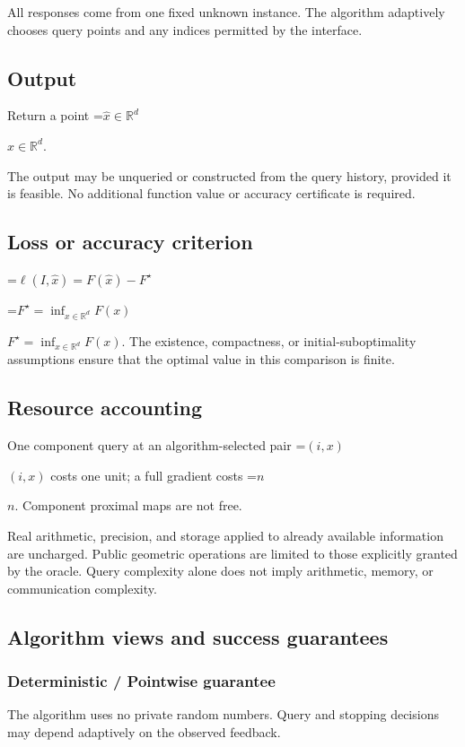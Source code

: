\documentclass[10pt,a4paper]{article}
\newcommand{\AtlasMath}[1]{\par\begingroup\centering\setbox0=\hbox{$\displaystyle #1$}\ifdim\wd0>1.4\linewidth\typeout{ATLAS WIDE FORMULA: \the\wd0}\fi\ifdim\wd0>\linewidth\resizebox{\linewidth}{!}{\box0}\else\box0\fi\par\endgroup}
\newcommand{\AtlasInlineMath}[1]{\begingroup\setbox0=\hbox{$#1$}\ifdim\wd0>.4\linewidth\endgroup\AtlasMath{#1}\else\endgroup$#1$\fi}
\begin{document}
All responses come from one fixed unknown instance. The algorithm adaptively chooses query points and any indices permitted by the interface.

\subsection{Output}
Return a point \AtlasInlineMath{\widehat x\in\mathbb R^d}.

The output may be unqueried or constructed from the query history, provided it is feasible. No additional function value or accuracy certificate is required.

\subsection{Loss or accuracy criterion}

\AtlasMath{\ell(I,\widehat{x})=F(\widehat{x})-F^\star}


\AtlasInlineMath{F^\star=\inf_{x\in \mathbb{R}^d}F(x)}. The existence, compactness, or initial-suboptimality assumptions ensure that the optimal value in this comparison is finite.

\subsection{Resource accounting}
One component query at an algorithm-selected pair \AtlasInlineMath{(i,x)} costs one unit; a full gradient costs \AtlasInlineMath{n}. Component proximal maps are not free.

Real arithmetic, precision, and storage applied to already available information are uncharged. Public geometric operations are limited to those explicitly granted by the oracle. Query complexity alone does not imply arithmetic, memory, or communication complexity.

\subsection{Algorithm views and success guarantees}
\subsubsection{Deterministic / Pointwise guarantee}
The algorithm uses no private random numbers. Query and stopping decisions may depend adaptively on the observed feedback.
\end{document}
